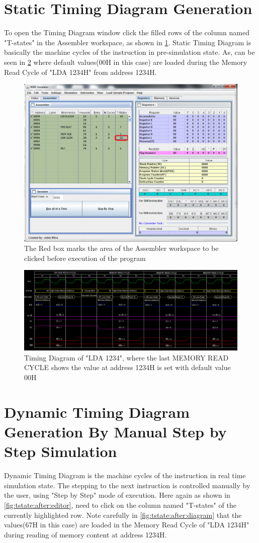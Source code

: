 \section{Static Timing Diagram Generation}
To open the Timing Diagram window click the filled rows of the column named "T-states" in the Assembler workspace, as shown in \cref{fig:tstate:before:editor}. Static Timing Diagram is basically the machine cycles of the instruction in pre-simulation state. As, can be seen in \cref{fig:tstate:before:diagram} where default values(00H in this case) are loaded during the Memory Read Cycle of "LDA 1234H" from address 1234H.  
\begin{figure}[htbp]
\centering
\includegraphics[width=0.75\linewidth]{./TStateEditorBefore}
\caption{The Red box marks the area of the Assembler workspace to be clicked before execution of the program}
\label{fig:tstate:before:editor}
\end{figure}
\begin{figure}[htbp]
\centering
\includegraphics[width=\linewidth]{./TStateBefore}
\caption{Timing Diagram of "LDA 1234", where the last MEMORY READ CYCLE shows the value at address 1234H is set with default value 00H}
\label{fig:tstate:before:diagram}
\end{figure}
\pagebreak
\section{Dynamic Timing Diagram Generation By Manual Step by Step Simulation}
Dynamic Timing Diagram is the machine cycles of the instruction in real time simulation state. The stepping to the next instruction is controlled manually by the user, using "Step by Step" mode of execution. Here again as shown in \cref{fig:tstate:after:editor}, need to click on the column named "T-states" of the currently highlighted row. Note carefully in \cref{fig:tstate:after:diagram} that the values(67H in this case) are loaded in the Memory Read Cycle of "LDA 1234H" during reading of memory content at address 1234H. 


